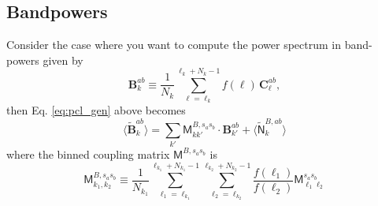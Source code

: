 \documentclass[a4paper,10pt]{article}
\newcommand{\nv}{\hat{\bf n}}
\begin{document}
\subsection{Bandpowers}
Consider the case where you want to compute the power spectrum in band-powers given by
\begin{equation}
  \mathbf{B}^{ab}_k\equiv\frac{1}{N_k}\sum_{\ell=\ell_k}^{\ell_k+N_k-1} f(\ell)\,\mathbf{C}^{ab}_\ell,
\end{equation}
then Eq. \ref{eq:pcl_gen} above becomes
\begin{equation}\label{eq:pcl_bin}
  \langle\tilde{\mathbf{B}}^{ab}_k\rangle=\sum_{k'}\mathsf{M}^{B,s_as_b}_{k k'}\cdot\mathbf{B}^{ab}_{k'}+
  \langle\tilde{\mathsf{N}}^{B,ab}_k\rangle
\end{equation}
where the binned coupling matrix $\mathsf{M}^{B,s_as_b}$ is
\begin{equation}
  \mathsf{M}^{B,s_as_b}_{k_1,k_2}\equiv\frac{1}{N_{k_1}}\sum_{\ell_1=\ell_{k_1}}^{\ell_{k_1}+N_{k_1}-1}\sum_{\ell_2=\ell_{k_2}}^{\ell_{k_2}+N_{k_2}-1}\frac{f(\ell_1)}{f(\ell_2)}
  \mathsf{M}^{s_as_b}_{\ell_1\ell_2}
\end{equation}

%
\end{document}

